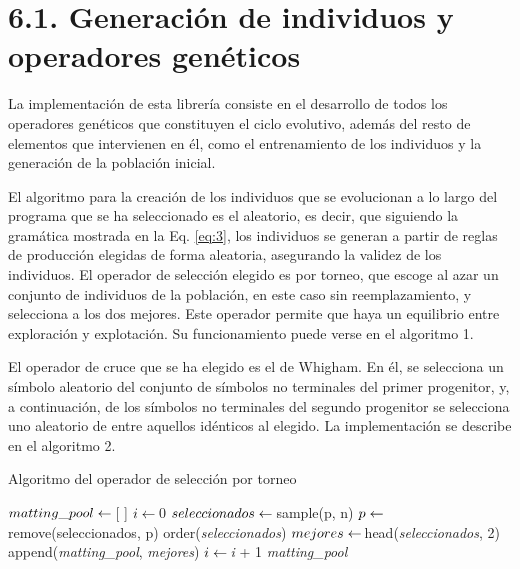 \documentclass[spanish,a4paper,12pt,twoside]{report}
\begin{document}
  \section*{\Large 6.1. Generación de individuos y operadores genéticos}
  La implementación de esta librería consiste en el desarrollo de todos los operadores genéticos que constituyen el ciclo evolutivo, además del resto de elementos que intervienen en él, como el entrenamiento de los individuos y la generación de la población inicial.  \par
  El algoritmo para la creación de los individuos que se evolucionan a lo largo del programa que se ha seleccionado es el aleatorio, es decir, que siguiendo la gramática mostrada en la Eq. \ref{eq:3}, los individuos se generan a partir de reglas de producción elegidas de forma aleatoria, asegurando la validez de los individuos. \vfill
  El operador de selección elegido es por torneo, que escoge al azar un conjunto de individuos de la población, en este caso sin reemplazamiento, y selecciona a los dos mejores. Este operador permite que haya un equilibrio entre exploración y explotación. Su funcionamiento puede verse en el algoritmo 1. \par\par
  El operador de cruce que se ha elegido es el de Whigham. En él, se selecciona un símbolo aleatorio del conjunto de símbolos no terminales del primer progenitor, y, a continuación, de los símbolos no terminales del segundo progenitor se selecciona uno aleatorio de entre aquellos idénticos al elegido. La implementación se describe en el algoritmo 2. \par
  \begin{algorithm}[H]
    \caption{Algoritmo del operador de selección por torneo}\label{selop}
    \begin{algorithmic}[1]
       
        \State $matting\_pool \gets \thinspace $[ ]
        \State $i \gets \thinspace $0
          \State $seleccionados \gets \thinspace $sample(p, n)
          \State $p \gets \thinspace $remove(seleccionados, p)
          \State order(\textit{seleccionados})
          \State $mejores \gets \thinspace $head(\textit{seleccionados}, 2)
          \State append(\textit{matting\_pool}, \textit{mejores})
          \State $i \gets \thinspace $\textit{i} + 1
        \EndWhile
        \State \Return \textit{matting\_pool}
      \EndFunction
    \end{algorithmic}
  \end{algorithm} 
\end{document}
